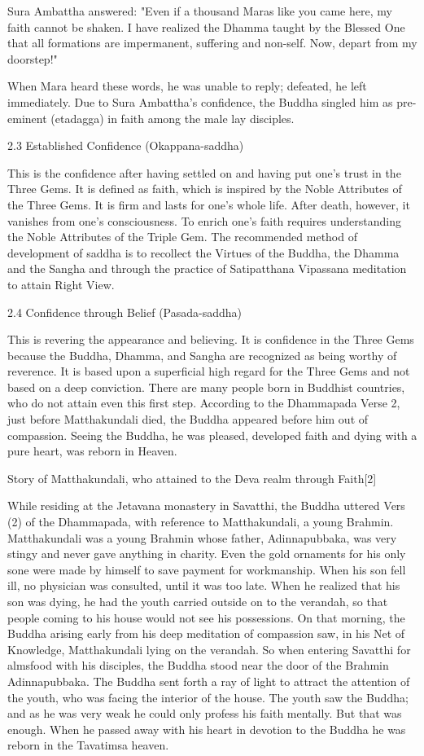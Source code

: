 Sura Ambattha answered: "Even if a thousand Maras like you came here, my faith cannot be shaken. I have realized the Dhamma taught by the Blessed One that all formations are impermanent, suffering and non-self. Now, depart from my doorstep!"

When Mara heard these words, he was unable to reply; defeated, he left immediately. Due to Sura Ambattha's confidence, the Buddha singled him as pre-eminent (etadagga) in faith among the male lay disciples.

2.3 Established Confidence (Okappana-saddha)

This is the confidence after having settled on and having put one's trust in the Three Gems. It is defined as faith, which is inspired by the Noble Attributes of the Three Gems. It is firm and lasts for one's whole life. After death, however, it vanishes from one's consciousness. To enrich one's faith requires understanding the Noble Attributes of the Triple Gem. The recommended method of development of saddha is to recollect the Virtues of the Buddha, the Dhamma and the Sangha and through the practice of Satipatthana Vipassana meditation to attain Right View.

2.4 Confidence through Belief (Pasada-saddha)

This is revering the appearance and believing. It is confidence in the Three Gems because the Buddha, Dhamma, and Sangha are recognized as being worthy of reverence. It is based upon a superficial high regard for the Three Gems and not based on a deep conviction. There are many people born in Buddhist countries, who do not attain even this first step. According to the Dhammapada Verse 2, just before Matthakundali died, the Buddha appeared before him out of compassion. Seeing the Buddha, he was pleased, developed faith and dying with a pure heart, was reborn in Heaven.

Story of Matthakundali, who attained to the Deva realm through Faith[2]

While residing at the Jetavana monastery in Savatthi, the Buddha uttered Vers (2) of the Dhammapada, with reference to Matthakundali, a young Brahmin. Matthakundali was a young Brahmin whose father, Adinnapubbaka, was very stingy and never gave anything in charity. Even the gold ornaments for his only sone were made by himself to save payment for workmanship. When his son fell ill, no physician was consulted, until it was too late. When he realized that his son was dying, he had the youth carried outside on to the verandah, so that people coming to his house would not see his possessions. On that morning, the Buddha arising early from his deep meditation of compassion saw, in his Net of Knowledge, Matthakundali lying on the verandah. So when entering Savatthi for almsfood with his disciples, the Buddha stood near the door of the Brahmin Adinnapubbaka. The Buddha sent forth a ray of light to attract the attention of the youth, who was facing the interior of the house. The youth saw the Buddha; and as he was very weak he could only profess his faith mentally. But that was enough. When he passed away with his heart in devotion to the Buddha he was reborn in the Tavatimsa heaven.

